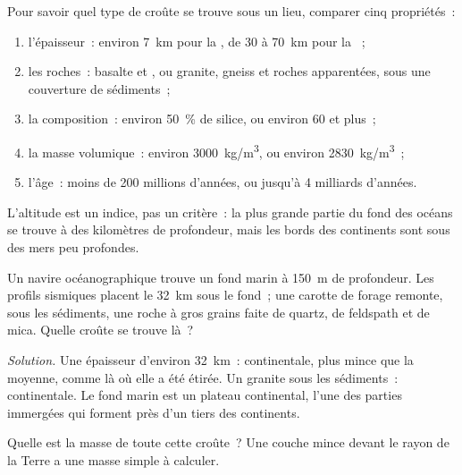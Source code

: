 \begin{method}\label{met:g12:continental-crust:compare}
Pour savoir quel type de croûte se trouve sous un lieu, comparer cinq
propriétés~:
\begin{enumerate}
  \item l'épaisseur~: environ \qty{7}{km} pour la , de 30 à
        \qty{70}{km} pour la ~;
  \item les roches~: basalte et , ou granite, gneiss et roches
        apparentées, sous une couverture de sédiments~;
  \item la composition~: environ \qty{50}{\percent} de silice, ou environ
        60 et plus~;
  \item la masse volumique~: environ \qty{3000}{kg/m^3}, ou environ
        \qty{2830}{kg/m^3}~;
  \item l'âge~: moins de 200 millions d'années, ou jusqu'à 4 milliards
        d'années.
\end{enumerate}
L'altitude est un indice, pas un critère~: la plus grande partie du fond
des océans se trouve à des kilomètres de profondeur, mais les bords des
continents sont sous des mers peu profondes.
\end{method}

\begin{example}\label{ex:g12:continental-crust:shelf}
Un navire océanographique trouve un fond marin à \qty{150}{m} de
profondeur. Les profils sismiques placent le  \qty{32}{km} sous le
fond~; une carotte de forage remonte, sous les sédiments, une roche à gros
grains faite de quartz, de feldspath et de mica. Quelle croûte se trouve
là~?

\emph{Solution.} Une épaisseur d'environ \qty{32}{km}~: continentale, plus
mince que la moyenne, comme là où elle a été étirée. Un granite sous les
sédiments~: continentale. Le fond marin est un plateau continental, l'une
des parties immergées qui forment près d'un tiers des continents.
\end{example}

Quelle est la masse de toute cette croûte~? Une couche mince devant le
rayon de la Terre a une masse simple à calculer.

